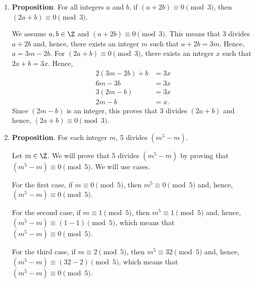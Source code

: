 \begin{enumerate}
\begin{enumerate}
\item \textbf{Proposition}. For all integers $a$ and $b$, if $(a + 2b) \equiv 0 \pmod 3$, then 
$(2a + b) \equiv 0 \pmod 3$.

\begin{myproof}
We assume $a, b \in \Z$ and $(a + 2b) \equiv 0 \pmod 3$.  This means that 3 divides $a + 2b$ and, hence, there exists an integer $m$ such that $a + 2b = 3m$.  Hence, $a = 3m - 2b$.  For 
$(2a + b) \equiv 0 \pmod 3$, there exists an integer $x$ such that $2a + b = 3x$.  Hence,
\begin{align*}
2(3m - 2b) + b &= 3x \\
       6m - 3b &= 3x \\
     3(2m - b) &= 3x \\
        2m - b &= x.
\end{align*}
Since $(2m - b)$ is an integer, this proves that 3 divides $(2a + b)$ and hence, 
$(2a + b) \equiv 0 \pmod 3$.
\end{myproof}

\item \textbf{Proposition}. For each integer $m$, 5 divides $\left(m^5 - m \right)$.

\begin{myproof}
Let $m \in \Z$.  We will prove that 5 divides $\left(m^5 - m \right)$ by proving that 
$\left(m^5 - m \right) \equiv 0 \pmod 5$.  We will use cases.

For the first case, if $m \equiv 0 \pmod 5$, then $m^5 \equiv 0 \pmod 5$ and, hence, 
$\left(m^5 - m \right) \equiv 0 \pmod 5$.

For the second case, if $m \equiv 1 \pmod 5$, then $m^5 \equiv 1 \pmod 5$ and, hence, 
$\left(m^5 - m \right) \equiv (1 - 1) \pmod 5$, which means that 
$\left(m^5 - m \right) \equiv 0 \pmod 5$.

For the third case, if $m \equiv 2 \pmod 5$, then $m^5 \equiv 32 \pmod 5$ and, hence, 
$\left(m^5 - m \right) \equiv (32 - 2) \pmod 5$, which means that 
$\left(m^5 - m \right) \equiv 0 \pmod 5$.
\end{myproof}
\end{enumerate}
\end{enumerate}


